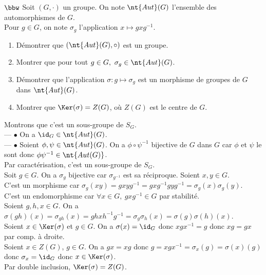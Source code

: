 \documentclass[11pt]{article}
\begin{document}
\begin{exercice}{$\bbw$}{}
    Soit $(G,\cdot)$ un groupe. On note $\nt{Aut}(G)$ l'ensemble des automorphismes de $G$.\\
    Pour $g\in G$, on note $\sigma_g$ l'application $x\mapsto gxg^{-1}$.
    \begin{enumerate}
        \item Démontrer que $(\nt{Aut}(G),\circ)$ est un groupe.
        \item Montrer que pour tout $g\in G, ~ \sigma_g \in \nt{Aut}(G)$.
        \item Démontrer que l'application $\sigma:g\mapsto\sigma_g$ est un morphisme de groupes de $G$ dans $\nt{Aut}(G)$.
        \item Montrer que $\Ker(\sigma)=Z(G)$, où $Z(G)$ est le centre de $G$.
    \end{enumerate}
    \tcblower
     Montrons que c'est un sous-groupe de $S_G$.\\
    --- $\bullet$ On a $\id_G\in\nt{Aut}(G)$.\\
    --- $\bullet$ Soient $\phi,\psi\in\nt{Aut}(G)$. On a $\phi\circ\psi^{-1}$ bijective de $G$ dans $G$ car $\phi$ et $\psi$ le sont donc $\phi\psi^{-1}\in\nt{Aut(G)}$.\\
    Par caractérisation, c'est un sous-groupe de $S_G$.\\
     Soit $g\in G$. On a $\sigma_g$ bijective car $\sigma_{g^{-1}}$ est sa réciproque. Soient $x,y\in G$.\\
    C'est un morphisme car $\sigma_g(xy)=gxyg^{-1}=gxg^{-1}gyg^{-1}=\sigma_g(x)\sigma_g(y)$.\\
    C'est un endomorphisme car $\forall x \in G, ~ gxg^{-1}\in G$ par stabilité.\\
     Soient $g,h,x\in G$. On a $\sigma(gh)(x)=\sigma_{gh}(x)=ghxh^{-1}g^{-1}=\sigma_g\sigma_h(x)=\sigma(g)\sigma(h)(x)$.\\
     \boxed{\subset} Soient $x\in\Ker(\sigma)$ et $g\in G$. On a $\sigma(x)=\id_G$ donc $xgx^{-1}=g$ donc $xg=gx$ par comp. à droite.\\
    \boxed{\supset} Soient $x\in Z(G)$, $g\in G$. On a $gx=xg$ donc $g=xgx^{-1}=\sigma_x(g)=\sigma(x)(g)$ donc $\sigma_x=\id_G$ donc $x\in\Ker(\sigma)$.\\
    Par double inclusion, $\Ker(\sigma)=Z(G)$.
\end{exercice}
\end{document}
